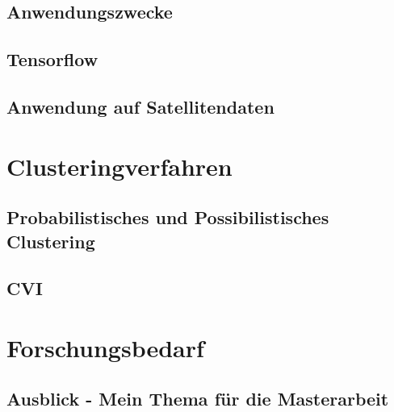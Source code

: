 \documentclass[11pt,fleqn]{book} %
\begin{document}
\section{Anwendungszwecke}
\section{Tensorflow}
\section{Anwendung auf Satellitendaten}


\chapter{Clusteringverfahren}
\section{Probabilistisches und Possibilistisches Clustering}
\section{CVI}
\chapter{Forschungsbedarf}
\section{Ausblick - Mein Thema für die Masterarbeit}

\vfill
\end{document}
